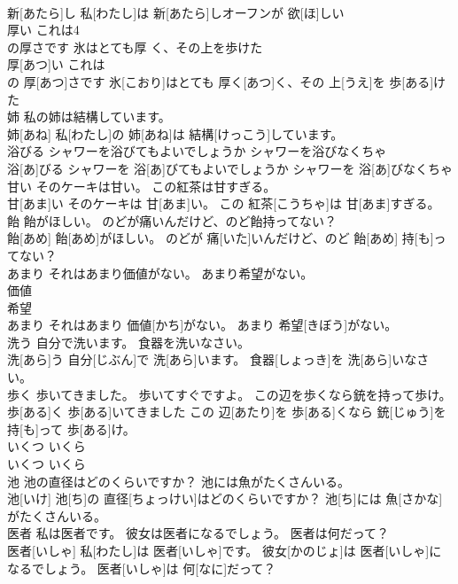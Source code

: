 \documentclass[8pt]{extreport}
\begin{document}
\begin{CJK}{UTF8}{min}
\\	新[あたら]し 私[わたし]は 新[あたら]しオーフンが 欲[ほ]しい
\\	厚い これは4
\\	の厚さです 氷はとても厚 く、その上を歩けた	
\\	厚[あつ]い これは 
\\	の 厚[あつ]さです 氷[こおり]はとても 厚く[あつ]く、その 上[うえ]を 歩[ある]けた
\\	姉 私の姉は結構しています。	
\\	姉[あね] 私[わたし]の 姉[あね]は 結構[けっこう]しています。
\\	浴びる シャワーを浴びてもよいでしょうか シャワーを浴びなくちゃ	
\\	浴[あ]びる シャワーを 浴[あ]びてもよいでしょうか シャワーを 浴[あ]びなくちゃ
\\	甘い そのケーキは甘い。 この紅茶は甘すぎる。	
\\	甘[あま]い そのケーキは 甘[あま]い。 この 紅茶[こうちゃ]は 甘[あま]すぎる。
\\	飴 飴がほしい。 のどが痛いんだけど、のど飴持ってない？	
\\	飴[あめ] 飴[あめ]がほしい。 のどが 痛[いた]いんだけど、のど 飴[あめ] 持[も]ってない？
\\	あまり それはあまり価値がない。 あまり希望がない。	
\\	価値 
\\	希望
\\	あまり それはあまり 価値[かち]がない。 あまり 希望[きぼう]がない。
\\	洗う 自分で洗います。 食器を洗いなさい。	
\\	洗[あら]う 自分[じぶん]で 洗[あら]います。 食器[しょっき]を 洗[あら]いなさい。
\\	歩く 歩いてきました。 歩いてすぐですよ。 この辺を歩くなら銃を持って歩け。	
\\	歩[ある]く 歩[ある]いてきました この 辺[あたり]を 歩[ある]くなら 銃[じゅう]を 持[も]って 歩[ある]け。
\\	いくつ いくら	
\\	いくつ いくら
\\	池 池の直径はどのくらいですか？ 池には魚がたくさんいる。	
\\	池[いけ] 池[ち]の 直径[ちょっけい]はどのくらいですか？ 池[ち]には 魚[さかな]がたくさんいる。
\\	医者 私は医者です。 彼女は医者になるでしょう。 医者は何だって？	
\\	医者[いしゃ] 私[わたし]は 医者[いしゃ]です。 彼女[かのじょ]は 医者[いしゃ]になるでしょう。 医者[いしゃ]は 何[なに]だって？

\end{CJK}
\end{document}
